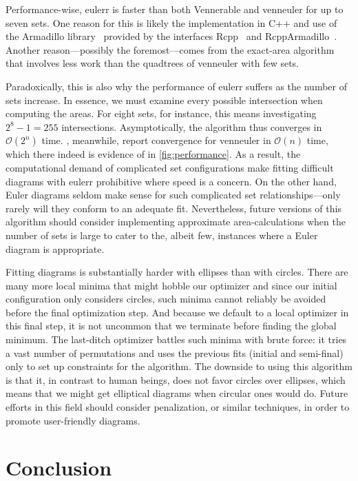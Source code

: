 \documentclass[
  oneside,
  openany,
  numbers=noendperiod,
  parskip=half,
  bibliography=totoc
]{scrbook}\usepackage[]{graphicx}\usepackage{xcolor}
\newcommand{\proglang}[1]{\textsf{#1}}
\newcommand{\pkg}[1]{{\fontseries{b}\selectfont #1}}
\begin{document}
Performance-wise, \pkg{eulerr} is faster than both \pkg{Vennerable} and
\pkg{venneuler} for up to seven sets. One reason for this is likely the implementation
in \proglang{C++} and use of the Armadillo library~\citep{Sanderson_2016}
provided by the interfaces \pkg{Rcpp}~\citep{Eddelbuettel_2011} and
\pkg{RcppArmadillo}~\citep{Eddelbuettel_2014}.
Another reason---possibly the foremost---comes from the exact-area algorithm that
involves less work than the quadtrees of \pkg{venneuler} with few sets.

Paradoxically, this is also why the performance of \pkg{eulerr}
suffers as the number of sets increase. In essence, we must examine every
possible intersection when computing the areas. For eight sets, for instance,
this means investigating $2^8-1 = 255$ intersections. Asymptotically, the
algorithm thus converges in $\mathcal{O}(2^n)$ time. \citet{Wilkinson_2012},
meanwhile, report convergence for \pkg{venneuler} in $\mathcal{O}(n)$ time, which
there indeed is evidence of in \cref{fig:performance}. As a result, the
computational demand of complicated set configurations make fitting difficult diagrams
with \pkg{eulerr} prohibitive where speed is a concern. On the other hand,
Euler diagrams seldom make sense for such complicated set relationships---only rarely will they
conform to an adequate fit. Nevertheless, future versions of this algorithm should
consider implementing approximate area-calculations when the number of sets is
large to cater to the, albeit few, instances where a Euler diagram is
appropriate.

Fitting diagrams is substantially harder with ellipses than with circles.
There are many more local minima that might hobble our optimizer
and since our initial configuration only
considers circles, such minima cannot reliably be avoided before the final
optimization step. And because we default to a local optimizer in this final step,
it is not uncommon that we terminate before finding the global minimum.
The last-ditch optimizer
battles such minima with brute force: it tries a vast number of permutations
and uses the previous fits (initial and semi-final) only to set up
constraints for the algorithm. The downside to using this algorithm is that it,
in contrast to human beings, does not favor circles over ellipses, which means
that we might get elliptical diagrams when circular ones would do. Future
efforts in this field should consider penalization, or similar techniques,
in order to promote user-friendly diagrams.

\section{Conclusion}
\label{sec:conclusion}
\end{document}
